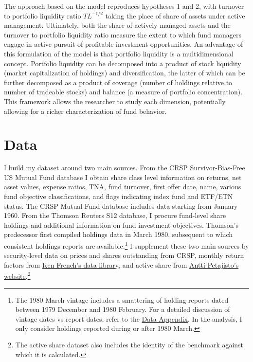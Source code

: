 \documentclass[]{book}
\let\rmarkdownfootnote\footnote%
\def\footnote{\protect\rmarkdownfootnote}
\theoremstyle{definition}
\theoremstyle{definition}
\theoremstyle{definition}
\theoremstyle{remark}
\begin{document}
The approach based on the \citet*{pst17L} model reproduces hypotheses 1
and 2, with turnover to portfolio liquidity ratio \(TL^{-1/2}\) taking
the place of share of assets under active management. Ultimately, both
the share of actively managed assets and the turnover to portfolio
liquidity ratio measure the extent to which fund managers engage in
active pursuit of profitable investment opportunities. An advantage of
this formulation of the model is that portfolio liquidity is a
multidimensional concept. Portfolio liquidity can be decomposed into a
product of stock liquidity (market capitalization of holdings) and
diversification, the latter of which can be further decomposed as a
product of coverage (number of holdings relative to number of tradeable
stocks) and balance (a measure of portfolio concentration). This
framework allows the researcher to study each dimension, potentially
allowing for a richer characterization of fund behavior.

\hypertarget{sec:Data}{%
\chapter{Data}\label{sec:Data}}

I build my dataset around two main sources. From the CRSP
Survivor-Bias-Free US Mutual Fund database I obtain share class level
information on returns, net asset values, expense ratios, TNA, fund
turnover, first offer date, name, various fund objective
classifications, and flags indicating index fund and ETF/ETN status. The
CRSP Mutual Fund database includes data starting from January 1960. From
the Thomson Reuters S12 database, I procure fund-level share holdings
and additional information on fund investment objectives. Thomson's
predecessor first compiled holdings data in March 1980, subsequent to
which consistent holdings reports are available.\footnote{The 1980 March
  vintage includes a smattering of holding reports dated between 1979
  December and 1980 February. For a detailed discussion of vintage dates
  vs report dates, refer to the
  \href{https://www.dropbox.com/s/qugvhb8b0wqp0cg/LJ_JMP_Data_Appendix.pdf?dl=0}{Data
  Appendix}. In the analysis, I only consider holdings reported during
  or after 1980 March.} I supplement these two main sources by
security-level data on prices and shares outstanding from CRSP, monthly
return factors from
\href{http://mba.tuck.dartmouth.edu/pages/faculty/ken.french/data_library.html}{Ken
French's data library}, and active share \citep{cp09, petajisto13} from
\href{http://www.petajisto.net/data.html}{Antti Petajisto's
website}.\footnote{The active share dataset also includes the identity
  of the benchmark against which it is calculated.}
\end{document}
